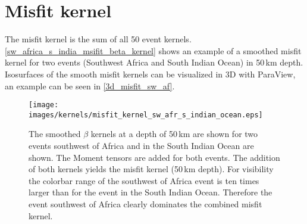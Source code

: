 \section{Misfit kernel}

The misfit kernel is the sum of all 50 event kernels. \autoref{sw_africa_s_india_msifit_beta_kernel} shows an example of a 
smoothed misfit kernel for two events (Southwest Africa and South Indian Ocean) in 50$\,$km depth.
Isosurfaces of the smooth misfit kernels can be visualized in 3D with ParaView, an example can be seen in \autoref{3d_misfit_sw_af}.


\begin{figure}[h]
\begin{center}
\texttt{[image: images/kernels/misfit\_kernel\_sw\_afr\_s\_indian\_ocean.eps]}
\caption[Surface of a smooth misfit kernel for two events]
{The smoothed $\beta$ kernels at a depth of 50$\,$km are shown for two events southwest of Africa and 
in the South Indian Ocean are shown. The Moment tensors are added for both events.
The addition of both kernels yields the misfit kernel (50$\,$km depth).
For visibility the colorbar range of the southwest of Africa event is ten times larger than for the event 
in the South Indian Ocean.
Therefore the event southwest of Africa clearly dominates the combined misfit kernel.}  
\label{sw_africa_s_india_msifit_beta_kernel}
\end{center}
\end{figure}



